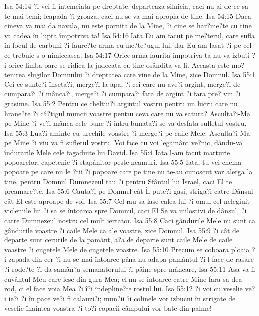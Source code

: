 Isa 54:14  ?i vei fi întemeiata pe dreptate: departeaza silnicia, caci nu ai de ce sa te mai temi; leapada ?i groaza, caci nu se va mai apropia de tine.
Isa 54:15  Daca cineva va mai da navala, nu este pornita de la Mine, ?i cine se har?uie?te cu tine va cadea în lupta împotriva ta!
Isa 54:16  Iata Eu am facut pe me?terul, care sufla în focul de carbuni ?i faure?te arma cu me?te?ugul lui, dar Eu am lasat ?i pe cel ce trebuie s-o nimiceasca.
Isa 54:17  Orice arma faurita împotriva ta nu va izbuti ?i orice limba oare se ridica la judecata cu tine osândita va fi. Aceasta este mo?tenirea slugilor Domnului ?i dreptatea care vine de la Mine, zice Domnul.
Isa 55:1  Cei ce sunte?i înseta?i, merge?i la apa, ?i cei care nu ave?i argint, merge?i de cumpara?i ?i mânca?i, merge?i ?i cumpara?i fara de argint ?i fara pre? vin ?i grasime.
Isa 55:2  Pentru ce cheltui?i argintul vostru pentru un lucru care nu hrane?te ?i câ?tigul muncii voastre pentru ceva care nu va satura? Asculta?i-Ma pe Mine ?i ve?i mânca cele bune ?i întru bunata?i se va desfata sufletul vostru.
Isa 55:3  Lua?i aminte cu urechile voastre ?i merge?i pe caile Mele. Asculta?i-Ma pe Mine ?i viu va fi sufletul vostru. Voi face cu voi legamânt ve?nic, dându-va îndurarile Mele cele fagaduite lui David.
Isa 55:4  Iata l-am facut marturie popoarelor, capetenie ?i stapânitor peste neamuri.
Isa 55:5  Iata, tu vei chema popoare pe care nu le ?tii ?i popoare care pe tine nu te-au cunoscut vor alerga la tine, pentru Domnul Dumnezeul tau ?i pentru Sfântul lui Israel, caci El te preamare?te.
Isa 55:6  Cauta?i pe Domnul cât Îl pute?i gasi, striga?i catre Dânsul cât El este aproape de voi.
Isa 55:7  Cel rau sa lase calea lui ?i omul cel nelegiuit vicleniile lui ?i sa se întoarca spre Domnul, caci El Se va milostivi de dânsul, ?i catre Dumnezeul nostru cel mult iertator.
Isa 55:8  Caci gândurile Mele nu sunt ca gândurile voastre ?i caile Mele ca ale voastre, zice Domnul.
Isa 55:9  ?i cât de departe sunt cerurile de la pamânt, a?a de departe sunt caile Mele de caile voastre ?i cugetele Mele de cugetele voastre.
Isa 55:10  Precum se coboara ploaia ?i zapada din cer ?i nu se mai întoarce pâna nu adapa pamântul ?i-l face de rasare ?i rode?te ?i da samân?a semanatorului ?i pâine spre mâncare,
Isa 55:11  Asa va fi cuvântul Meu care iese din gura Mea; el nu se întoarce catre Mine fara sa dea rod, ci el face voia Mea ?i î?i îndepline?te rostul lui.
Isa 55:12  ?i voi cu veselie ve?i ie?i ?i în pace ve?i fi calauzi?i; mun?ii ?i colinele vor izbucni în strigate de veselie înaintea voastra ?i to?i copacii câmpului vor bate din palme!

